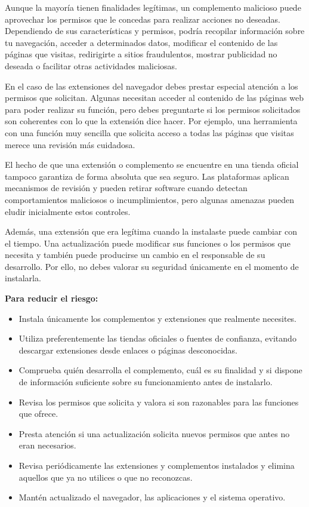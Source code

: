 \documentclass[
  spanish,
  a4paper,
  openany]{book}
\begin{document}
Aunque la mayoría tienen finalidades legítimas, un complemento malicioso puede aprovechar los permisos que le concedas para realizar acciones no deseadas. Dependiendo de sus características y permisos, podría recopilar información sobre tu navegación, acceder a determinados datos, modificar el contenido de las páginas que visitas, redirigirte a sitios fraudulentos, mostrar publicidad no deseada o facilitar otras actividades maliciosas.

En el caso de las extensiones del navegador debes prestar especial atención a los permisos que solicitan. Algunas necesitan acceder al contenido de las páginas web para poder realizar su función, pero debes preguntarte si los permisos solicitados son coherentes con lo que la extensión dice hacer. Por ejemplo, una herramienta con una función muy sencilla que solicita acceso a todas las páginas que visitas merece una revisión más cuidadosa.

El hecho de que una extensión o complemento se encuentre en una tienda oficial tampoco garantiza de forma absoluta que sea seguro. Las plataformas aplican mecanismos de revisión y pueden retirar software cuando detectan comportamientos maliciosos o incumplimientos, pero algunas amenazas pueden eludir inicialmente estos controles.

Además, una extensión que era legítima cuando la instalaste puede cambiar con el tiempo. Una actualización puede modificar sus funciones o los permisos que necesita y también puede producirse un cambio en el responsable de su desarrollo. Por ello, no debes valorar su seguridad únicamente en el momento de instalarla.

\textbf{Para reducir el riesgo:}

\begin{itemize}
\item
  Instala únicamente los complementos y extensiones que realmente necesites.
\item
  Utiliza preferentemente las tiendas oficiales o fuentes de confianza, evitando descargar extensiones desde enlaces o páginas desconocidas.
\item
  Comprueba quién desarrolla el complemento, cuál es su finalidad y si dispone de información suficiente sobre su funcionamiento antes de instalarlo.
\item
  Revisa los permisos que solicita y valora si son razonables para las funciones que ofrece.
\item
  Presta atención si una actualización solicita nuevos permisos que antes no eran necesarios.
\item
  Revisa periódicamente las extensiones y complementos instalados y elimina aquellos que ya no utilices o que no reconozcas.
\item
  Mantén actualizado el navegador, las aplicaciones y el sistema operativo.
\end{itemize}
\end{document}
